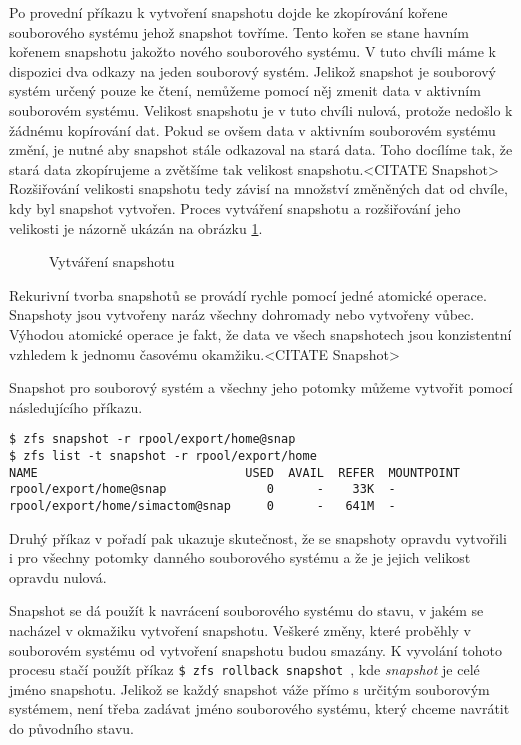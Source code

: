 Po provední příkazu k vytvoření snapshotu dojde ke zkopírování kořene souborového systému jehož snapshot tovříme. Tento kořen se stane havním kořenem snapshotu jakožto nového souborového systému. V tuto chvíli máme k dispozici dva odkazy na jeden souborový systém. Jelikož snapshot je souborový systém určený pouze ke čtení, nemůžeme pomocí něj zmenit data v aktivním souborovém systému. Velikost snapshotu je v tuto chvíli nulová, protože nedošlo k žádnému kopírování dat. Pokud se ovšem data v aktivním souborovém systému změní, je nutné aby snapshot stále odkazoval na stará data. Toho docílíme tak, že stará data zkopírujeme a zvětšíme tak velikost snapshotu.<CITATE Snapshot> Rozšiřování velikosti snapshotu tedy závisí na množství změněných dat od chvíle, kdy byl snapshot vytvořen. Proces vytváření snapshotu a rozšiřování jeho velikosti je názorně ukázán na obrázku \ref{snapshotproces}.
\begin{figure}[h]
    \caption{Vytváření snapshotu}
    \label{snapshotproces}
\end{figure}

Rekurivní tvorba snapshotů se provádí rychle pomocí jedné atomické operace. Snapshoty jsou vytvořeny naráz všechny dohromady nebo vytvořeny vůbec. Výhodou atomické operace je fakt, že data ve všech snapshotech jsou konzistentní vzhledem k jednomu časovému okamžiku.<CITATE Snapshot>

Snapshot pro souborový systém a všechny jeho potomky můžeme vytvořit pomocí následujícího příkazu.
\begin{verbatim}
$ zfs snapshot -r rpool/export/home@snap
$ zfs list -t snapshot -r rpool/export/home
NAME                             USED  AVAIL  REFER  MOUNTPOINT
rpool/export/home@snap              0      -    33K  -
rpool/export/home/simactom@snap     0      -   641M  -
\end{verbatim}
Druhý příkaz v pořadí pak ukazuje skutečnost, že se snapshoty opravdu vytvořili i pro všechny potomky danného souborového systému a že je jejich velikost opravdu nulová.

Snapshot se dá použít k navrácení souborového systému do stavu, v jakém se nacházel v okmažiku vytvoření snapshotu. Veškeré změny, které proběhly v souborovém systému od vytvoření snapshotu budou smazány. K vyvolání tohoto procesu stačí použít příkaz \verb|$ zfs rollback snapshot |, kde \emph{snapshot} je celé jméno snapshotu. Jelikož se každý snapshot váže přímo s určitým souborovým systémem, není třeba zadávat jméno souborového systému, který chceme navrátit do původního stavu. 